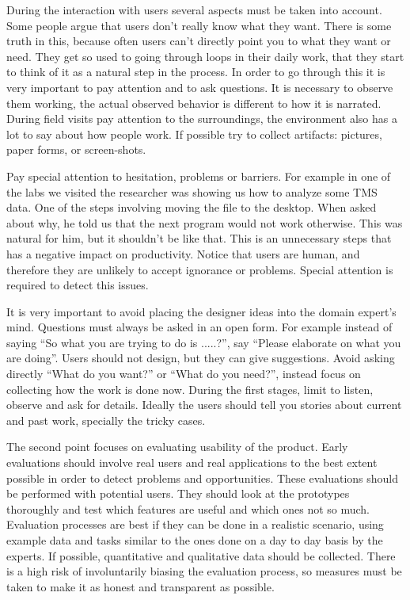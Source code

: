During the interaction with users several aspects must be taken into account. 
Some people argue that users don't really know what they want. There is some truth in this, because often users can't directly point you to what they want or need. They get so used to going through loops in their daily work, that they start to think of it as a natural step in the process. In order to go through this it is very important to pay attention and to ask questions. It is necessary to observe them working, the actual observed behavior is different to how it is narrated. During field visits pay attention to the surroundings, the environment also has a lot to say about how people work. If possible try to collect artifacts: pictures, paper forms, or screen-shots.

Pay special attention to hesitation, problems or barriers. For example in one of the labs we visited the researcher was showing us how to analyze some TMS data. One of the steps involving moving the file to the desktop. When asked about why, he told us that the next program would not work otherwise. This was natural for him, but it shouldn't be like that. This is an unnecessary steps that has a negative impact on productivity. Notice that users are human, and therefore they are unlikely to accept ignorance or problems. Special attention is required to detect this issues.

It is very important to avoid placing the designer ideas into the domain expert's mind. Questions must always be asked in an open form. For example instead of saying "`So what you are trying to do is .....?"', say "`Please elaborate on what you are doing"'. Users should not design, but they can give suggestions. Avoid asking directly "`What do you want?"' or "`What do you need?"', instead focus on collecting how the work is done now. During the first stages, limit to listen, observe and ask for details. Ideally the users should tell you stories about current and past work, specially the tricky cases. 

\smallskip

The second point focuses on evaluating usability of the product.  Early evaluations should involve real users and real applications to the best extent possible in order to detect problems and opportunities. These evaluations should be performed with potential users. They should look at the prototypes thoroughly and test which features are useful and which ones not so much. Evaluation processes are best if they can be done in a realistic scenario, using example data and tasks similar to the ones done on a day to day basis by the experts. If possible, quantitative and qualitative data should be collected. There is a high risk of involuntarily biasing the evaluation process, so measures must be taken to make it as honest and transparent as possible. 

